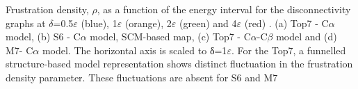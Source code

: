 \documentclass[a0paper,portrait]{baposter}
\begin{document}
\begin{poster}
{\begin{center}
\end{center}
Frustration density, $\rho$, as a function of the energy interval for the disconnectivity graphs at $\delta$=0.5$\varepsilon$ (blue), 1$\varepsilon$ (orange), 2$\varepsilon$ (green) and 4$\varepsilon$ (red) . (a) Top7 - C$\alpha$ model, (b) S6 - C$\alpha$ model, SCM-based map, (c) Top7 - C$\alpha$-C$\beta$ model and (d) M7- C$\alpha$ model. The horizontal axis is scaled to δ=1$\varepsilon$. 
For the Top7, a funnelled structure-based model representation shows distinct fluctuation in the frustration density parameter. These fluctuations are absent for S6 and M7}

\end{poster}
\end{document}
